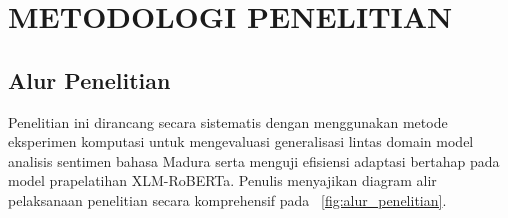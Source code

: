 
\chapter{METODOLOGI PENELITIAN}

\section{Alur Penelitian}

Penelitian ini dirancang secara sistematis dengan menggunakan metode eksperimen komputasi untuk mengevaluasi generalisasi lintas domain model analisis sentimen bahasa Madura serta menguji efisiensi adaptasi bertahap pada model prapelatihan XLM-RoBERTa. Penulis menyajikan diagram alir pelaksanaan penelitian secara komprehensif pada \figurename~\ref{fig:alur_penelitian}.

